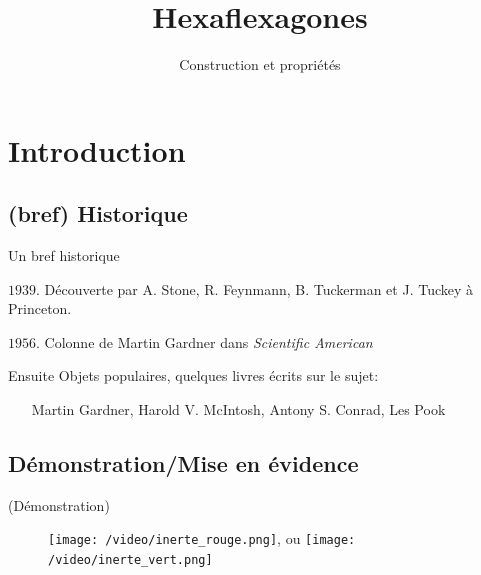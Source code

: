 \documentclass[french,xcolor=dvipsnames]{beamer}
\begin{document}
	\title{Hexaflexagones}
	\subtitle{Construction et propriétés}
	\frame[plain]{\maketitle}
	

\AtBeginSection
{
}

	
	\section{Introduction}
		\subsection{(bref) Historique}
		\begin{frame}{Un bref historique}

			\begin{list}{Intro}{}
				\item[$\textit{1939}$.] Découverte  par A. Stone, R. Feynmann, B. Tuckerman et J. Tuckey à Princeton.
				\item[$\textit{1956}$.]Colonne de Martin Gardner dans \textit{Scientific American}
				\item[Ensuite] Objets populaires, quelques livres écrits sur le sujet:
					\begin{enumerate}
						\item[] Martin Gardner, Harold V. McIntosh, Antony S. Conrad, Les Pook
					\end{enumerate}
			\end{list}
		\end{frame}
		
		\subsection{Démonstration/Mise en évidence}
		\begin{frame}{(Démonstration)}
		\begin{center}
			\begin{figure}
			\texttt{[image: /video/inerte\_rouge.png]}, ou
			\texttt{[image: /video/inerte\_vert.png]}
			\end{figure}
		\end{center}
		\end{frame}
		
\end{document}
